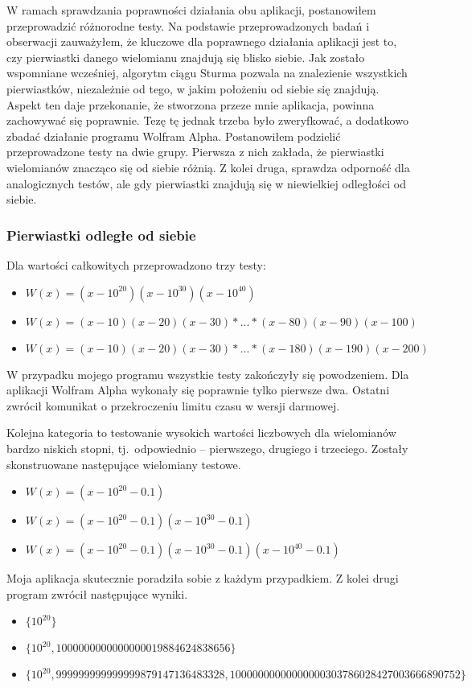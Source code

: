 W ramach sprawdzania poprawności działania obu aplikacji, postanowiłem przeprowadzić różnorodne testy. Na podstawie przeprowadzonych badań i obserwacji zauważyłem, że kluczowe dla poprawnego działania aplikacji jest to, czy pierwiastki danego wielomianu znajdują się blisko siebie. Jak zostało wspomniane wcześniej, algorytm ciągu Sturma pozwala na znalezienie wszystkich pierwiastków, niezależnie od tego, w jakim położeniu od siebie się znajdują. Aspekt ten daje przekonanie, że stworzona przeze mnie aplikacja, powinna zachowywać się poprawnie. Tezę tę jednak trzeba było zweryfkować, a dodatkowo zbadać działanie programu Wolfram Alpha. Postanowiłem podzielić przeprowadzone testy na dwie grupy. Pierwsza z nich zakłada, że pierwiastki wielomianów znacząco się od siebie różnią. Z kolei druga, sprawdza odporność dla analogicznych testów, ale gdy pierwiastki znajdują się w niewielkiej odległości od siebie.

\subsubsection {Pierwiastki odległe od siebie}

Dla wartości całkowitych przeprowadzono trzy testy:
\begin{itemize}
	\item $W(x)=(x-10^{20})(x-10^{30})(x-10^{40})$
	\item $W(x)=(x-10)(x-20)(x-30)*...*(x-80)(x-90)(x-100)$
	\item $W(x)=(x-10)(x-20)(x-30)*...*(x-180)(x-190)(x-200)$
\end{itemize}

W przypadku mojego programu wszystkie testy zakończyły się powodzeniem. Dla aplikacji Wolfram Alpha wykonały się poprawnie tylko pierwsze dwa. Ostatni zwrócił komunikat o przekroczeniu limitu czasu w wersji darmowej.

Kolejna kategoria to testowanie wysokich wartości liczbowych dla wielomianów bardzo niskich stopni, tj.\ odpowiednio -- pierwszego, drugiego i trzeciego. Zostały skonstruowane następujące wielomiany testowe.
\begin{itemize}
	\item $W(x)=(x-10^{20}-0.1)$
	\item $W(x)=(x-10^{20}-0.1)(x-10^{30}-0.1)$
	\item $W(x)=(x-10^{20}-0.1)(x-10^{30}-0.1)(x-10^{40}-0.1)$
\end{itemize}

Moja aplikacja skutecznie poradziła sobie z każdym przypadkiem. Z kolei drugi program zwrócił następujące wyniki.
\begin{itemize}
	\item $\{10^{20}\}$
	\item $\{10^{20}, 1000000000000000019884624838656\}$
	\item $\{10^{20}, 999999999999999879147136483328, 10000000000000000303786028427003666890752\}$
\end{itemize}

